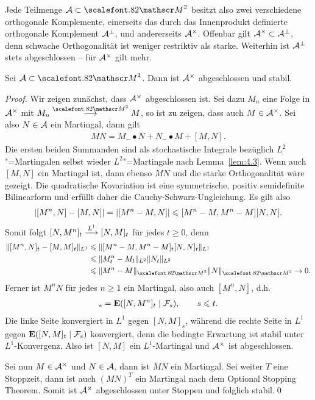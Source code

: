 Jede Teilmenge $\AA\subset\MM^2$ besitzt also zwei verschiedene orthogonale
Komplemente, einerseits das durch das Innenprodukt
definierte orthogonale Komplement $\AA^\perp$, und andererseits 
$\AA^\times$. Offenbar gilt $\AA^\times \subset\AA^\perp$, denn schwache
Orthogonalität ist weniger restriktiv als starke. Weiterhin ist $\AA^\perp$
stets abgeschlossen -- für $\AA^\times$ gilt mehr.

\begin{lemma}
\label{lem:5.1}
Sei $\AA \subset \MM^2$. Dann ist $\AA^\times$ abgeschlossen und stabil.\fish
\end{lemma}
\begin{proof}
Wir zeigen zunächst, dass $\AA^\times$ abgeschlossen ist. Sei dazu $M_n$ eine
Folge in $\AA^\times$ mit $M_n\Mto M$, so ist zu zeigen, dass auch
$M\in\AA^\times$. Sei also $N\in\AA$ ein Martingal, dann gilt
\begin{align*}
MN = M_-\bullet N + N_-\bullet M + [M,N]. 
\end{align*}
Die ersten beiden Summanden sind als stochastische
Integrale bezüglich $L^2$"=Martingalen selbst wieder $L^2$"=Martingale nach
Lemma~\ref{lem:4.3}. Wenn auch $[M,N]$ ein Martingal ist, dann ebenso $MN$ und
die starke Orthogonalität wäre gezeigt. Die quadratische Kovariation ist eine
symmetrische, positiv semidefinite Bilinearform und erfüllt daher die
Cauchy-Schwarz-Ungleichung. Es gilt also
\begin{align*}
\abs{[M^n,N]-[M,N]}  =
\abs{[M^n-M,N]} \le [M^n-M,M^n-M][N,N].
\end{align*}
Somit folgt $[N,M^n]_t\lto{1} [N,M]_t$ für jedes $t\ge 0$, denn
\begin{align*}
\norm{[M^n,N]_t-[M,M]_t}_{L^1}
&\le \norm{[M^n-M,M^n-M]_t[N,N]_t}_{L^1}\\ 
&\le \norm{M_t^n-M_t}_{L^2}\norm{N_t}_{L^2}\\
&\le \norm{M^n-M}_{\MM^2}\norm{N}_{\MM^2}\to 0.
\end{align*}
Ferner ist $M^nN$ für jedes $n\ge 1$ ein Martingal, also auch $[M^n,N]$, d.h.
\begin{align*}
[N,M^n]_s = \E ([N,M^n]_t\mid \FF_s),\qquad s\le t.
\end{align*}
Die linke Seite konvergiert in $L^1$ gegen $[N,M]_s$, während die rechte
Seite in $L^1$ gegen $\E([N,M]_t\mid\FF_s)$ konvergiert, denn die bedingte
Erwartung ist stabil unter $L^1$-Konvergenz. Also ist $[N,M]$ ein
$L^1$-Martingal und $\AA^\times$ ist abgeschlossen.

Sei nun $M\in\AA^\times$ und $N\in\AA$, dann ist $MN$ ein Martingal. Sei weiter
$T$ eine Stoppzeit, dann ist auch $(MN)^T$ ein Martingal nach dem Optional
Stopping Theorem. Somit ist $\AA^\times$ abgeschlossen unter Stoppen und
folglich stabil.\qed
\end{proof}

